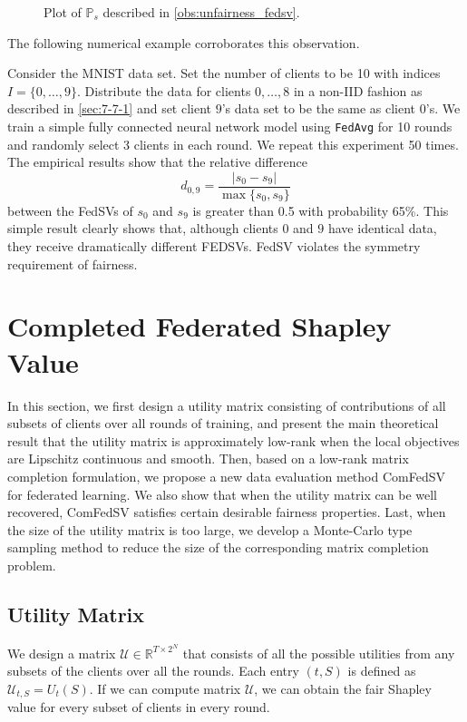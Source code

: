 \begin{observation}
\begin{figure}[t]
        \caption{Plot of $\mathbb{P}_s$ described in \autoref{obs:unfairness_fedsv}.}
        \label{fig:ps}
    \end{figure}
\end{observation}

The following numerical example corroborates this observation.

\begin{example} \label{ex:unfair}
    Consider the MNIST data set. Set the number of clients to be 10 with indices $I = \{0, \dots, 9\}$. Distribute the data for clients $0, \dots, 8$ in a non-IID fashion as described in \autoref{sec:7-7-1} and set client $9$'s data set to be the same as client $0$'s. We train a simple fully connected neural network model using \texttt{FedAvg} for 10 rounds and randomly select 3 clients in each round. We repeat this experiment 50 times. The empirical results show that the relative difference 
    \begin{equation} \label{eq:relative_difference}
            d_{0,9} = \frac{|s_0 - s_9|}{\max\{s_0, s_9\}}
    \end{equation}
    between the FedSVs of $s_0$ and $s_{9}$ is greater than 0.5 with probability 65\%. This simple result clearly shows that, although clients $0$ and $9$ have identical data, they receive dramatically different FEDSVs. FedSV violates the symmetry requirement of fairness.  
\end{example}


\section{Completed Federated Shapley Value} \label{sec:7-6}

In this section, we first design a utility matrix consisting of contributions of all subsets of clients over all rounds of training, and present the main theoretical result that the utility matrix is approximately low-rank when the local objectives are Lipschitz continuous and smooth. Then, based on a low-rank matrix completion formulation, we propose a new data evaluation method ComFedSV for federated learning. We also show that when the utility matrix can be well recovered, ComFedSV satisfies certain desirable fairness properties. Last, when the size of the utility matrix is too large, we develop a Monte-Carlo type sampling method to reduce the size of the corresponding matrix completion problem.

\subsection{Utility Matrix} \label{sec:7-6-1}
We design a matrix $\mathcal{U} \in \mathbb{R}^{T \times 2^N}$ that consists of all the possible utilities from any subsets of the clients over all the rounds. Each entry $(t, S)$ is defined as 
$\mathcal{U}_{t, S} = U_t(S)$. If we can compute matrix $\mathcal{U}$, we can obtain the fair Shapley value for every subset of clients in every round.

